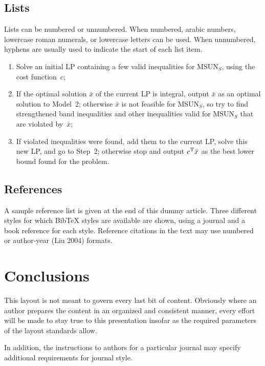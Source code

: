 \documentclass[twocolumn]{svjour3}          %
\newcommand{\MSUN}{{\mathrm{MSUN}}}
\begin{document}
\subsection{Lists}

Lists can be numbered or unnumbered. When numbered, arabic
numbers, lowercase roman numerals, or lowercase letters can be
used. When unnumbered, hyphens are usually used to indicate the
start of each list item.

\begin{enumerate}
\item Solve an initial LP containing a few valid inequalities
for $\MSUN_S$, using the cost function~$c$;
\item If the optimal solution $\bar{x}$ of the current LP
is integral, output $\bar{x}$ as an optimal solution to Model~2;
otherwise $\bar{x}$ is not feasible for $\MSUN_S$, so try to find
strengthened band inequalities and other inequalities valid for
$\MSUN_S$ that are violated by~$\bar{x}$;
\item If violated inequalities were found,
add them to the current LP, solve this new LP, and go to Step~2;
otherwise stop and output $c^{\rm T}\bar{x}$
as the best lower bound found for the problem.
\end{enumerate}

\subsection{References}

A sample reference list is given at the end of this dummy article.
Three different styles for which BibTeX styles are available are
shown, using a journal and a book reference for each style. Reference
citations in the text may use numbered \cite{ref1} or author-year (Liu
2004) formats.

\section{Conclusions}

This layout is not meant to govern every last bit of content.
Obviously where an author prepares the content in an organized and
consistent manner, every effort will be made to stay true to this
presentation insofar as the required parameters of the layout
standards allow.

In addition, the instructions to authors for a particular journal
may specify additional requirements for journal style.
\end{document}
